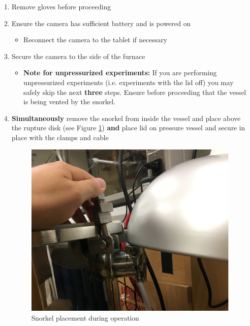 \documentclass[letterpaper,11pt]{article}
\begin{document}
\begin{enumerate}
    \item Remove gloves before proceeding
	\item Ensure the camera has sufficient battery and is powered on
        \begin{itemize}
        \item Reconnect the camera to the tablet if necessary
        \end{itemize}
\newpage
    \item Secure the camera to the side of the furnace
        \begin{itemize}
        \item \textbf{Note for unpressurized experiments:} If you are performing
            unpressurized experiments (i.e. experiments with the lid off) you
            may safely skip the next \textbf{three} steps. Ensure before 
            proceeding that the vessel is being vented by the snorkel.
        \end{itemize}

    \item \textbf{Simultaneously} remove the snorkel from inside the vessel and 
        place above the rupture 
        disk (see Figure \ref{fig:rupture_hood}) \textbf{and} place lid on 
        pressure vessel and secure in place with the clamps and cable

\begin{figure}[H]
\centering\includegraphics[width=.3\textwidth]{rupture_hood.jpg}
\caption{Snorkel placement during operation}
\label{fig:rupture_hood}
\end{figure} 


\end{enumerate}
\end{document}

